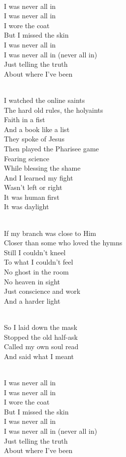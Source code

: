 \begin{lyrics}
\\
I was never all in\\
I was never all in\\
I wore the coat\\
But I missed the skin\\
I was never all in\\
I was never all in
(never all in)\\
Just telling the truth\\
About where I’ve been

\\
I watched the online saints\\
The hard old rules, the holyaints\\
Faith in a fist\\
And a book like a list\\
They spoke of Jesus\\
Then played the Pharisee game\\
Fearing science\\
While blessing the shame\\
And I learned my fight\\
Wasn’t left or right\\
It was human first\\
It was daylight

\\
If my branch was close to Him\\
Closer than some who loved the hymns\\
Still I couldn’t kneel\\
To what I couldn’t feel\\
No ghost in the room\\
No heaven in sight\\
Just conscience and work\\
And a harder light

\\
So I laid down the mask\\
Stopped the old half-ask\\
Called my own soul read\\
And said what I meant

\\
I was never all in\\
I was never all in\\
I wore the coat\\
But I missed the skin\\
I was never all in\\
I was never all in
(never all in)\\
Just telling the truth\\
About where I’ve been


\end{lyrics}
